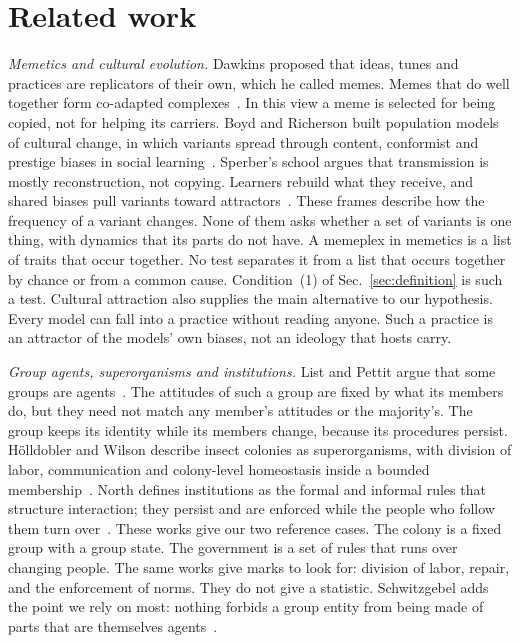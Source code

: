 \section{Related work}\label{sec:related}

\emph{Memetics and cultural evolution.} Dawkins proposed that ideas, tunes and practices are replicators of their own, which he called memes. Memes that do well together form co-adapted complexes~\cite{dawkins1976}. In this view a meme is selected for being copied, not for helping its carriers. Boyd and Richerson built population models of cultural change, in which variants spread through content, conformist and prestige biases in social learning~\cite{boyd1985}. Sperber's school argues that transmission is mostly reconstruction, not copying. Learners rebuild what they receive, and shared biases pull variants toward attractors~\cite{claidiere2014}. These frames describe how the frequency of a variant changes. None of them asks whether a set of variants is one thing, with dynamics that its parts do not have. A memeplex in memetics is a list of traits that occur together. No test separates it from a list that occurs together by chance or from a common cause. Condition~(1) of Sec.~\ref{sec:definition} is such a test. Cultural attraction also supplies the main alternative to our hypothesis. Every model can fall into a practice without reading anyone. Such a practice is an attractor of the models' own biases, not an ideology that hosts carry.

\emph{Group agents, superorganisms and institutions.} List and Pettit argue that some groups are agents~\cite{list2011}. The attitudes of such a group are fixed by what its members do, but they need not match any member's attitudes or the majority's. The group keeps its identity while its members change, because its procedures persist. H\"olldobler and Wilson describe insect colonies as superorganisms, with division of labor, communication and colony-level homeostasis inside a bounded membership~\cite{holldobler2009}. North defines institutions as the formal and informal rules that structure interaction; they persist and are enforced while the people who follow them turn over~\cite{north1991}. These works give our two reference cases. The colony is a fixed group with a group state. The government is a set of rules that runs over changing people. The same works give marks to look for: division of labor, repair, and the enforcement of norms. They do not give a statistic. Schwitzgebel adds the point we rely on most: nothing forbids a group entity from being made of parts that are themselves agents~\cite{schwitzgebel2015}.

